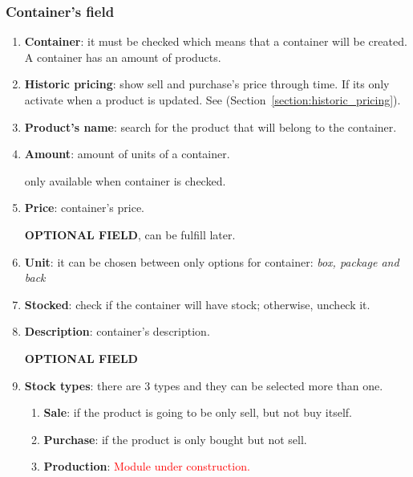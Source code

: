\documentclass[a4paper,11pt]{refart}
\newcommand\InConstruction{\textcolor{red}{Module under construction.}}
\begin{document}
\subsubsection{Container's field}
\begin{enumerate}
	\item \textbf{Container}: it must be checked which means that a container will be created. A container has an amount of products.
	\item \textbf{Historic pricing}: show sell and purchase's price through time. If its only activate when a product is updated. See (Section~\ref{section:historic_pricing}).
	\item \textbf{Product's name}: search for the product that will belong to the container.
	\item \textbf{Amount}: amount of units of a container.
		\medskip
		\begin{leftbar}
			only available when container is checked.
		\end{leftbar}
	\item \textbf{Price}:  container's price.
		\medskip
		\begin{leftbar}
			\textbf{OPTIONAL FIELD}, can be fulfill later.
		\end{leftbar}
	\item \textbf{Unit}: it can be chosen between only options for container: \emph{box, package and back}
	\item \textbf{Stocked}: check if the container will have stock; otherwise, uncheck it.
	\item \textbf{Description}: container's description.
	\medskip
		\begin{leftbar}
			\textbf{OPTIONAL FIELD}
		\end{leftbar}
	\item \textbf{Stock types}: there are 3 types and they can be selected more than one.
		\begin{enumerate}
			\item \textbf{Sale}: if the product is going to be only sell, but not buy itself.
			\item \textbf{Purchase}: if the product is only bought but not sell.
			\item \textbf{Production}:  \InConstruction{}
		\end{enumerate}
	

\end{enumerate}
\end{document}
